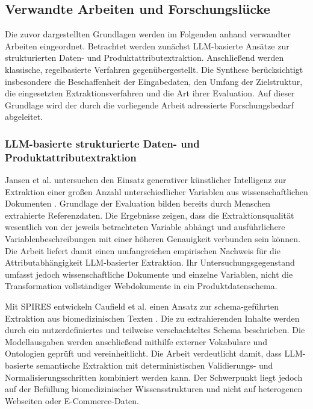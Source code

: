 \subsection{Verwandte Arbeiten und Forschungslücke}

Die zuvor dargestellten Grundlagen werden im Folgenden anhand verwandter Arbeiten eingeordnet. Betrachtet werden zunächst LLM-basierte Ansätze zur strukturierten 
Daten- und Produktattributextraktion. Anschließend werden klassische, regelbasierte Verfahren gegenübergestellt. Die Synthese berücksichtigt insbesondere die 
Beschaffenheit der Eingabedaten, den Umfang der Zielstruktur, die eingesetzten Extraktionsverfahren und die Art ihrer Evaluation. Auf dieser Grundlage wird der 
durch die vorliegende Arbeit adressierte Forschungsbedarf abgeleitet.

\subsubsection{LLM-basierte strukturierte Daten- und Produktattributextraktion}

Jansen et al. untersuchen den Einsatz generativer künstlicher Intelligenz zur Extraktion einer großen Anzahl unterschiedlicher Variablen aus wissenschaftlichen 
Dokumenten \cite{data_extraction_ai}. Grundlage der Evaluation bilden bereits durch Menschen extrahierte Referenzdaten. Die Ergebnisse zeigen, dass die Extraktionsqualität 
wesentlich von der jeweils betrachteten Variable abhängt und ausführlichere Variablenbeschreibungen mit einer höheren Genauigkeit verbunden sein können. Die Arbeit 
liefert damit einen umfangreichen empirischen Nachweis für die Attributabhängigkeit LLM-basierter Extraktion. Ihr Untersuchungsgegenstand umfasst jedoch 
wissenschaftliche Dokumente und einzelne Variablen, nicht die Transformation vollständiger Webdokumente in ein Produktdatenschema.

Mit SPIRES entwickeln Caufield et al. einen Ansatz zur schema-geführten Extraktion aus biomedizinischen Texten \cite{caufield2024spires}. Die zu extrahierenden 
Inhalte werden durch ein nutzerdefiniertes und teilweise verschachteltes Schema beschrieben. Die Modellausgaben werden anschließend mithilfe externer Vokabulare 
und Ontologien geprüft und vereinheitlicht. Die Arbeit verdeutlicht damit, dass LLM-basierte semantische Extraktion mit deterministischen Validierungs- und 
Normalisierungsschritten kombiniert werden kann. Der Schwerpunkt liegt jedoch auf der Befüllung biomedizinischer Wissensstrukturen und nicht auf heterogenen 
Webseiten oder E-Commerce-Daten.

